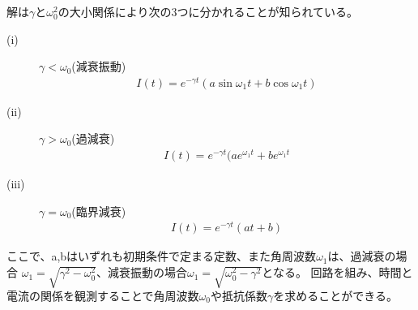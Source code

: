 \documentclass[a4j,10pt]{jarticle}
\begin{document}
解は$\gamma$と$\omega_{0}^{2}$の大小関係により次の3つに分かれることが知られている。
\begin{description}
\item[(i)]$\gamma<\omega_{0}$(減衰振動)
\begin{eqnarray}
\label{freq}
				I(t)=e^{-{\gamma}t}(a\sin\omega_{1}t+b\cos\omega_{1}t)
\end{eqnarray}
\item[(ii)]$\gamma>\omega_{0}$(過減衰)
\begin{eqnarray}
\label{over}
				I(t)=e^{-{\gamma}t}(ae^{\omega_{1}t}+be^{\omega_{1}t}
\end{eqnarray}
\item[(iii)]$\gamma=\omega_{0}$(臨界減衰)
\begin{eqnarray}
\label{critical}
				I(t)=e^{-{\gamma}t}(at+b)
\end{eqnarray}
\end{description}

ここで、a,bはいずれも初期条件で定まる定数、また角周波数$\omega_{1}$は、過減衰の場合
$\omega_{1}=\sqrt{\gamma^{2}-\omega_{0}^{2}}$、減衰振動の場合$\omega_{1}=\sqrt{\omega_{0}^{2}-\gamma^{2}}$となる。
回路を組み、時間と電流の関係を観測することで角周波数$\omega_{0}$や抵抗係数$\gamma$を求めることができる。
\end{document}
